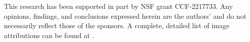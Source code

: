This research has been supported in part by NSF grant CCF-2217733. Any opinions, findings, and conclusions expressed herein are the authors’ and do not necessarily reflect those of the sponsors. A complete, detailed list of image attributions can be found at \cite{anonymous_repo}.
